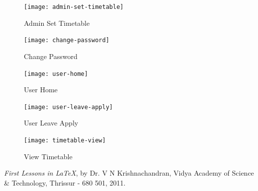 \begin{figure}[!h]
	\begin{center}
		\texttt{[image: admin-set-timetable]}
	\end{center}
\caption{Admin Set Timetable}
\end{figure}

\begin{figure}[!h]
	\begin{center}
		\texttt{[image: change-password]}
	\end{center}
\caption{Change Password}
\end{figure}

\begin{figure}[!h]
	\begin{center}
		\texttt{[image: user-home]}
	\end{center}
\caption{User Home}
\end{figure}

\begin{figure}[!h]
	\begin{center}
		\texttt{[image: user-leave-apply]}
	\end{center}
\caption{User Leave Apply}
\end{figure}

\begin{figure}[!h]
	\begin{center}
		\texttt{[image: timetable-view]}
	\end{center}
\caption{View Timetable}
\end{figure}

%
%
\clearpage
{}
%
%
\begin{thebibliography}{99}
%
{\em First Lessons in \LaTeX}, by Dr. V N Krishnachandran, 
Vidya Academy of Science \& Technology, 
Thrissur - 680 501, 2011.
%
\end{thebibliography}
%
%
%

%
%
%
%
